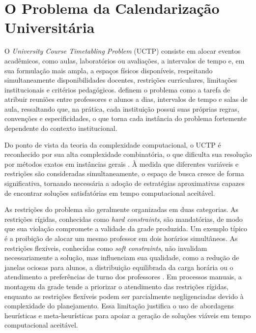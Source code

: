 \section{O Problema da Calendarização Universitária}
\label{sec:2.1}

O \textit{University Course Timetabling Problem} (UCTP) consiste em alocar eventos acadêmicos, como aulas, laboratórios ou avaliações, a intervalos de tempo e, em sua formulação mais ampla, a espaços físicos disponíveis, respeitando simultaneamente disponibilidades docentes, restrições curriculares, limitações institucionais e critérios pedagógicos.  definem o problema como a tarefa de atribuir reuniões entre professores e alunos a dias, intervalos de tempo e salas de aula, ressaltando que, na prática, cada instituição possui suas próprias regras, convenções e especificidades, o que torna cada instância do problema fortemente dependente do contexto institucional.

Do ponto de vista da teoria da complexidade computacional, o UCTP é reconhecido por sua alta complexidade combinatória, o que dificulta sua resolução por métodos exatos em instâncias gerais \cite[p.~1]{premananda2024}. À medida que diferentes variáveis e restrições são consideradas simultaneamente, o espaço de busca cresce de forma significativa, tornando necessária a adoção de estratégias aproximativas capazes de encontrar soluções satisfatórias em tempo computacional aceitável.

As restrições do problema são geralmente organizadas em duas categorias. As restrições rígidas, conhecidas como \textit{hard constraints}, são mandatórias, de modo que sua violação compromete a validade da grade produzida. Um exemplo típico é a proibição de alocar um mesmo professor em dois horários simultâneos. As restrições flexíveis, conhecidas como \textit{soft constraints}, não invalidam necessariamente a solução, mas influenciam sua qualidade, como a redução de janelas ociosas para alunos, a distribuição equilibrada da carga horária ou o atendimento a preferências de turno dos professores \cite{weare1995}. Em processos manuais, a montagem da grade tende a priorizar o atendimento das restrições rígidas, enquanto as restrições flexíveis podem ser parcialmente negligenciadas devido à complexidade do planejamento. Essa limitação justifica o uso de abordagens heurísticas e meta-heurísticas para apoiar a geração de soluções viáveis em tempo computacional aceitável.
